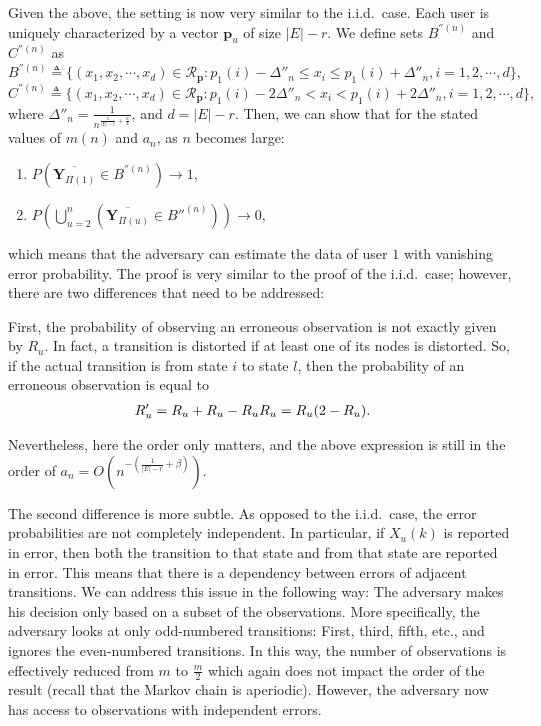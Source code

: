 Given the above, the setting is now very similar to the i.i.d.\ case. Each user is uniquely characterized by a vector $\textbf{p}_u$ of size $|E|-r$. We define sets $B^{''(n)}$ and $C^{''(n)}$ as
\[
 B^{''(n)}\triangleq \{(x_1, x_2, \cdots ,x_{d}) \in \mathcal{R}_{\textbf{p}}: p_1(i)-\Delta''_n \leq x_i \leq p_1(i)+\Delta''_n, i=1,2 , \cdots ,d\},
\]
\[
 C^{''(n)}\triangleq \{(x_1, x_2, \cdots ,x_{d}) \in \mathcal{R}_{\textbf{p}}:
  p_1(i)-2 \Delta''_n < x_i < p_1(i)+2 \Delta''_n, i=1,2, \cdots, d\},
\]
where $\Delta''_n= \frac{1}{n^{\frac{1}{|E|-r}+\frac{\alpha}{4}}}$, and $d= |E|-r$. Then, we can show that for the stated values of $m(n)$ and $a_n$, as $n$ becomes large:
\begin{enumerate}
\item $P\left( \overline{\textbf{Y}_{\Pi(1) }}\in B^{''(n)}\right) \rightarrow 1$,
\item $P\left( \bigcup\limits_{u=2}^{n} \left(\overline{\textbf{Y}_{\Pi(u)}}\in B{''}^{(n)}\right)\right) \rightarrow 0$,
\end{enumerate}
which means that the adversary can estimate the data of user $1$ with vanishing error probability. The proof is very similar to the proof of the i.i.d.\ case; however, there are two differences that need to be addressed:

First, the probability of observing an erroneous observation is not exactly given by $R_u$. In fact, a transition is distorted if at least one of its nodes is distorted. So, if the actual transition is from state $i$ to state $l$, then the probability of an erroneous observation is equal to
\begin{align}
	\nonumber R'_u&=R_u+R_u-R_uR_u =R_u(2-R_u).
\end{align}


Nevertheless, here the order only matters, and the above expression is still in the order of $a_n =O \left( n^{-\left(\frac{1}{|E|-r}+\beta \right)} \right)$.

The second difference is more subtle. As opposed to the i.i.d.\ case, the error probabilities are not completely independent. In particular, if $X_u(k)$ is reported in error, then both the transition to that state and from that state are reported in error. This means that there is a dependency between errors of adjacent transitions. We can address this issue in the following way:  The adversary makes his decision only based on a subset of the observations. More specifically, the adversary looks at only odd-numbered transitions: First, third, fifth, etc., and ignores the even-numbered transitions.  In this way, the number of observations is effectively reduced from $m$ to $\frac{m}{2}$ which again does not impact the order of the result (recall that the Markov chain is aperiodic). However, the adversary now has access to observations with independent errors.



